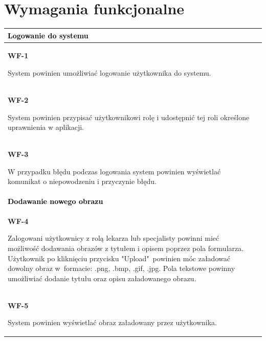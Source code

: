 \documentclass{scrreprt}
\begin{document}
	\section{Wymagania funkcjonalne}
	\begin{center}
		\begin{tabularx}{\textwidth}[t]{XX}
		\arrayrulecolor{black}
		\hline
		\textbf{\linespread{1.5}\textcolor{black}{Logowanie do systemu}} & \\
		\hline
		\textbf{\textcolor{myBlue}{WF-1}}
		\hspace{1cm}
			\begin{minipage}[t]{1.7\linewidth}%
			 System powinien umożliwiać logowanie użytkownika do systemu.
			\end{minipage}\\
		\textbf{\textcolor{myBlue}{WF-2}}
		\hspace{1cm}
			\begin{minipage}[t]{1.7\linewidth}%
			 System powinien przypisać użytkownikowi rolę i udostępnić tej roli okre\'slone uprawnienia w aplikacji.
			\end{minipage}\\
		\textbf{\textcolor{myBlue}{WF-3}} 
		\hspace{1cm}
			\begin{minipage}[t]{1.7\linewidth}%
			 W przypadku błędu podczas logowania system powinien wy\'swietlać komunikat o niepowodzeniu i przyczynie błędu.
			\end{minipage}\\
		
		\hline
		\textbf{\textcolor{black}{Dodawanie nowego obrazu}} \\
		\hline
		\textbf{\textcolor{myBlue}{WF-4}}
		\hspace{1cm}
			\begin{minipage}[t]{1.7\linewidth}%
			Zalogowani użytkownicy z rolą lekarza lub specjalisty powinni mieć możliwo\'sć dodawania obrazów z tytułem i opisem poprzez pola formularza. Użytkownik po kliknięciu przycisku "Upload"~powinien móc załadować dowolny obraz w~formacie: .png, .bmp, .gif, .jpg. Pola tekstowe powinny umożliwiać dodanie tytułu oraz opisu załadowanego obrazu.
			\end{minipage}\\
		\textbf{\textcolor{myBlue}{WF-5}}
		\hspace{1cm}
			\begin{minipage}[t]{1.7\linewidth}%
			System powinien wy\'swietlać obraz załadowany przez użytkownika.
\end{minipage}\\


\end{tabularx}
\end{center}
\end{document}
